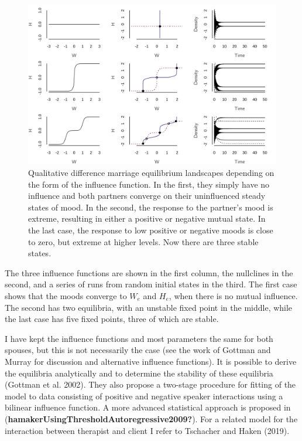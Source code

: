 \documentclass[
  a4paper,
  DIV=11,
  numbers=noendperiod,
  oneside]{scrreprt}
\begin{document}
\begin{figure}

{\centering \includegraphics{media/ch4n/fig-ch4n-img10-old-58.png}

}

\caption{\label{fig-ch4n-img10-old-58}Qualitative difference marriage
equilibrium landscapes depending on the form of the influence function.
In the first, they simply have no influence and both partners converge
on their uninfluenced steady states of mood. In the second, the response
to the partner's mood is extreme, resulting in either a positive or
negative mutual state. In the last case, the response to low positive or
negative moods is close to zero, but extreme at higher levels. Now there
are three stable states.}

\end{figure}

The three influence functions are shown in the first column, the
nullclines in the second, and a series of runs from random initial
states in the third. The first case shows that the moods converge to
\(W_{e}\) and \(H_{e}\), when there is no mutual influence. The second
has two equilibria, with an unstable fixed point in the middle, while
the last case has five fixed points, three of which are stable.

I have kept the influence functions and most parameters the same for
both spouses, but this is not necessarily the case (see the work of
Gottman and Murray for discussion and alternative influence functions).
It is possible to derive the equilibria analytically and to determine
the stability of these equilibria (Gottman et al. 2002). They also
propose a two-stage procedure for fitting of the model to data
consisting of positive and negative speaker interactions using a
bilinear influence function. A more advanced statistical approach is
proposed in (\textbf{hamakerUsingThresholdAutoregressive2009?}). For a
related model for the interaction between therapist and client I refer
to Tschacher and Haken (2019).
\end{document}
